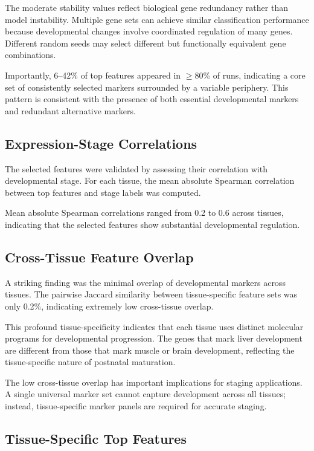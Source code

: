 The moderate stability values reflect biological gene redundancy rather than model instability. Multiple gene sets can achieve similar classification performance because developmental changes involve coordinated regulation of many genes. Different random seeds may select different but functionally equivalent gene combinations.

Importantly, 6--42\% of top features appeared in $\geq$80\% of runs, indicating a core set of consistently selected markers surrounded by a variable periphery. This pattern is consistent with the presence of both essential developmental markers and redundant alternative markers.

\subsection{Expression-Stage Correlations}

The selected features were validated by assessing their correlation with developmental stage. For each tissue, the mean absolute Spearman correlation between top features and stage labels was computed.

Mean absolute Spearman correlations ranged from 0.2 to 0.6 across tissues, indicating that the selected features show substantial developmental regulation.

\subsection{Cross-Tissue Feature Overlap}

A striking finding was the minimal overlap of developmental markers across tissues. The pairwise Jaccard similarity between tissue-specific feature sets was only 0.2\%, indicating extremely low cross-tissue overlap.

This profound tissue-specificity indicates that each tissue uses distinct molecular programs for developmental progression. The genes that mark liver development are different from those that mark muscle or brain development, reflecting the tissue-specific nature of postnatal maturation.

The low cross-tissue overlap has important implications for staging applications. A single universal marker set cannot capture development across all tissues; instead, tissue-specific marker panels are required for accurate staging.

\subsection{Tissue-Specific Top Features}

